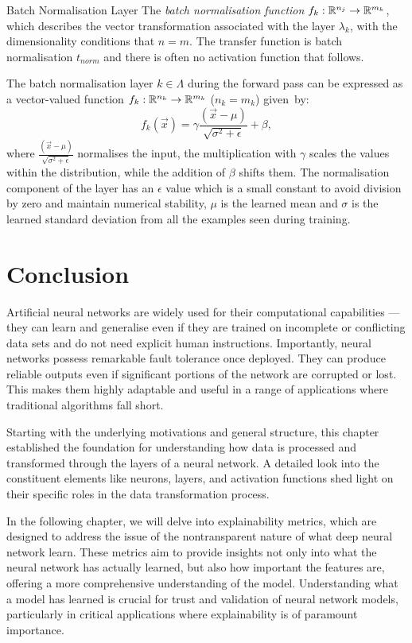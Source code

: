 \begin{Definition}{Batch Normalisation Layer}{}
The \emph{batch normalisation function} $f_k:\mathbb{R}^{n_j}\to \mathbb{R}^{m_k}$, which describes the vector transformation associated with the layer $\lambda_k$, with the dimensionality conditions that $n = m$. The transfer function is batch normalisation $t_{norm}$ and there is often no activation function that follows.
\end{Definition}


The batch normalisation layer $k\in \Lambda$ during the forward pass can be expressed as a vector-valued function $f_k:\mathbb{R}^{n_k}\to \mathbb{R}^{m_k}$ ($n_k=m_k$) given~by:
\begin{equation}
    f_k(\vec{x}) = \gamma \frac{(\vec{x}-\mu)}{\sqrt{\sigma^2 +\epsilon}} + \beta ,
\end{equation}
where $\frac{(\vec{x}-\mu)}{\sqrt{\sigma^2 +\epsilon}}$ normalises the input, the multiplication with $\gamma$ scales the values within the distribution, while the addition of $\beta$ shifts them. The normalisation component of the layer has an $\epsilon$ value which is a small constant to avoid division by zero and maintain numerical stability, $\mu$ is the learned mean and $\sigma$ is the learned standard deviation from all the examples seen during training.

\section{Conclusion}

Artificial neural networks are widely used for their computational capabilities --- they can learn and generalise even if they are trained on incomplete or conflicting data sets and do not need explicit human instructions. Importantly, neural networks possess remarkable fault tolerance once deployed. They can produce reliable outputs even if significant portions of the network are corrupted or lost. This makes them highly adaptable and useful in a range of applications where traditional algorithms fall short.

Starting with the underlying motivations and general structure, this chapter established the foundation for understanding how data is processed and transformed through the layers of a neural network. A detailed look into the constituent elements like neurons, layers, and activation functions shed light on their specific roles in the data transformation process.

In the following chapter, we will delve into explainability metrics, which are designed to address the issue of the nontransparent nature of what deep neural network learn. These metrics aim to provide insights not only into what the neural network has actually learned, but also how important the features are, offering a more comprehensive understanding of the model. Understanding what a model has learned is crucial for trust and validation of neural network models, particularly in critical applications where explainability is of paramount importance.